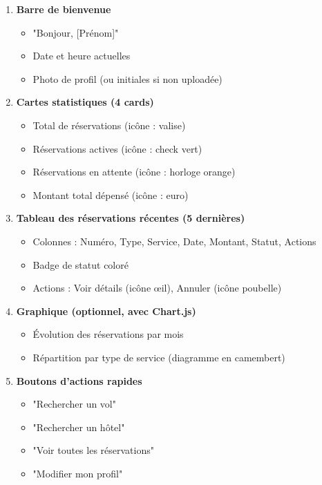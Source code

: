 \documentclass[12pt,a4paper]{report}
\begin{document}
\begin{enumerate}
    \item \textbf{Barre de bienvenue}
    \begin{itemize}
        \item "Bonjour, [Prénom]"
        \item Date et heure actuelles
        \item Photo de profil (ou initiales si non uploadée)
    \end{itemize}
    
    \item \textbf{Cartes statistiques (4 cards)}
    \begin{itemize}
        \item Total de réservations (icône : valise)
        \item Réservations actives (icône : check vert)
        \item Réservations en attente (icône : horloge orange)
        \item Montant total dépensé (icône : euro)
    \end{itemize}
    
    \item \textbf{Tableau des réservations récentes (5 dernières)}
    \begin{itemize}
        \item Colonnes : Numéro, Type, Service, Date, Montant, Statut, Actions
        \item Badge de statut coloré
        \item Actions : Voir détails (icône œil), Annuler (icône poubelle)
    \end{itemize}
    
    \item \textbf{Graphique (optionnel, avec Chart.js)}
    \begin{itemize}
        \item Évolution des réservations par mois
        \item Répartition par type de service (diagramme en camembert)
    \end{itemize}
    
    \item \textbf{Boutons d'actions rapides}
    \begin{itemize}
        \item "Rechercher un vol"
        \item "Rechercher un hôtel"
        \item "Voir toutes les réservations"
        \item "Modifier mon profil"
    \end{itemize}
\end{enumerate}
\end{document}
